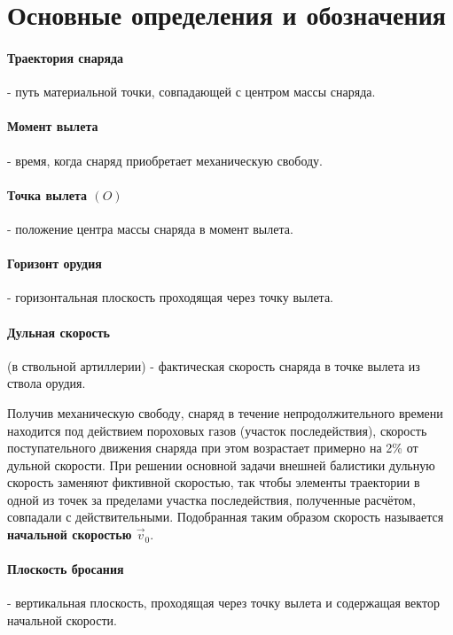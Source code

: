 \section{Основные определения и обозначения}

\paragraph{Траектория снаряда}- путь материальной точки, совпадающей с центром массы снаряда.

\paragraph{Момент вылета} - время, когда снаряд приобретает механическую свободу.

\paragraph{Точка вылета $(O)$} - положение центра массы снаряда в момент вылета.

\paragraph{Горизонт орудия} - горизонтальная плоскость проходящая через точку вылета.

\paragraph{Дульная скорость} (в ствольной артиллерии) - фактическая скорость снаряда в точке вылета из ствола орудия.

Получив механическую свободу, снаряд в течение непродолжительного времени находится под действием пороховых газов (участок последействия), скорость поступательного движения снаряда при этом возрастает примерно на 2\% от дульной скорости. При решении основной задачи внешней балистики дульную скорость заменяют фиктивной скоростью, так чтобы элементы траектории в одной из точек за пределами участка последействия, полученные расчётом, совпадали с действительными. Подобранная таким образом скорость называется \textbf{начальной скоростью $\vec{v}_0$}.

\paragraph{Плоскость бросания }- вертикальная плоскость, проходящая через точку вылета и содержащая вектор начальной скорости.

